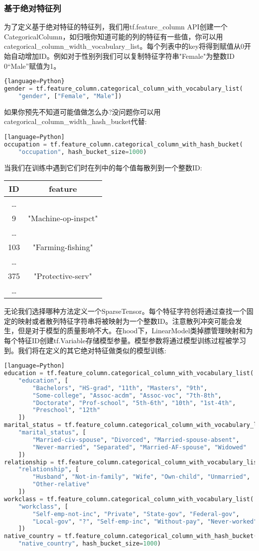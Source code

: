 \subsubsection{基于绝对特征列}
为了定义基于绝对特征的特征列，我们用tf.feature\_column API创建一个CategoricalColumn，如归哦你知道可能的列的特征有一些值，你可以用categorical\_column\_width\_vocabulary\_list。每个列表中的key将得到赋值从0开始自动增加ID。例如对于性别列我们可以复制特征字符串"Female"为整数ID 0“Male”赋值为1。
\begin{lstlisting}[language=Python]{language=Python}
gender = tf.feature_column.categorical_column_with_vocabulary_list(
    "gender", ["Female", "Male"])
\end{lstlisting}
如果你预先不知道可能值做怎么办?没问题你可以用categorical\_column\_width\_hash\_bucket代替:
\begin{lstlisting}[language=Python][language=Python]
occupation = tf.feature_column.categorical_column_with_hash_bucket(
    "occupation", hash_bucket_size=1000)
\end{lstlisting}
当我们在训练中遇到它们时在列中的每个值每散列到一个整数ID:
\begin{tabular}{|c|c|}
\hline
ID&feature\\
\hline
\ldots&\\
\hline
9&"Machine-op-inspct"\\
\hline
\ldots&\\
\hline
103&"Farming-fishing"\\
\hline
\ldots&\\
\hline
375&"Protective-serv"\\
\hline
\ldots&\\
\hline
\end{tabular}
无论我们选择哪种方法定义一个SparseTensor。每个特征字符创将通过查找一个固定的映射或者散列特征字符串将被映射为一个整数ID。注意散列冲突可能会发生，但是对于模型的质量影响不大。在hood下，LinearModel类掉膘管理映射和为每个特征ID创建tf.Variable存储模型参量。模型参数将通过模型训练过程被学习到。我们将在定义的其它绝对特征做类似的模型训练:
\begin{lstlisting}[language=Python][language=Python]
education = tf.feature_column.categorical_column_with_vocabulary_list(
    "education", [
        "Bachelors", "HS-grad", "11th", "Masters", "9th",
        "Some-college", "Assoc-acdm", "Assoc-voc", "7th-8th",
        "Doctorate", "Prof-school", "5th-6th", "10th", "1st-4th",
        "Preschool", "12th"
    ])
marital_status = tf.feature_column.categorical_column_with_vocabulary_list(
    "marital_status", [
        "Married-civ-spouse", "Divorced", "Married-spouse-absent",
        "Never-married", "Separated", "Married-AF-spouse", "Widowed"
    ])
relationship = tf.feature_column.categorical_column_with_vocabulary_list(
    "relationship", [
        "Husband", "Not-in-family", "Wife", "Own-child", "Unmarried",
        "Other-relative"
    ])
workclass = tf.feature_column.categorical_column_with_vocabulary_list(
    "workclass", [
        "Self-emp-not-inc", "Private", "State-gov", "Federal-gov",
        "Local-gov", "?", "Self-emp-inc", "Without-pay", "Never-worked"
    ])
native_country = tf.feature_column.categorical_column_with_hash_bucket(
    "native_country", hash_bucket_size=1000)
\end{lstlisting}

